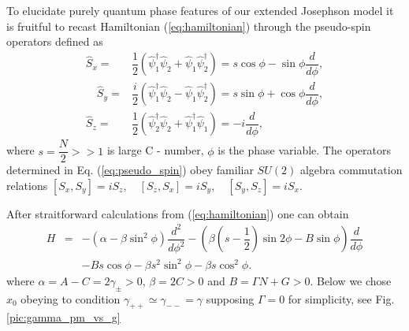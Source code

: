 \documentclass[aps, pre, preprint, groupedaddress, superscriptaddress, showkeys, showpacs] {revtex4-1}
\begin{document}
To elucidate purely quantum phase features of our extended Josephson model it is fruitful to recast Hamiltonian (\ref{eq:hamiltonian}) through the pseudo-spin operators defined as
% 
\begin{subequations}
\begin{align}
\hat{S}_x = & \dfrac{1}{2} (\hat{\psi}_1^\dag \hat{\psi}_2 + \hat{\psi}_1 \hat{\psi}_2^\dag) = s \cos{\phi} - \sin{\phi} \dfrac{d}{d \phi}, \\
\quad \hat{S}_y = & \dfrac{i}{2} (\hat{\psi}_1^\dag \hat{\psi}_2 - \hat{\psi}_1 \hat{\psi}_2^\dag) = s \sin{\phi} + \cos{\phi} \dfrac{d}{d \phi}, \\
\hat{S}_z = & \dfrac{1}{2} (\hat{\psi}_2^\dag \hat{\psi}_2 + \hat{\psi}_1^\dag \hat{\psi}_1) = -i\dfrac{d}{d \phi},
\end{align}
\label{eq:pseudo_spin}
\end{subequations}
%
where $s = \dfrac{N}{2} >> 1$ is large { C - number}, $\phi$ is the phase variable.
The operators determined in Eq. (\ref{eq:pseudo_spin}) obey familiar $SU(2)$ algebra commutation relations $[S_x, S_y] = iS_z, \quad[S_z, S_x] = iS_y, \quad[S_y, S_z] = iS_x$.

After straitforward calculations from (\ref{eq:hamiltonian}) one can obtain
%
\begin{equation}
\begin{array}{lcl}
H & = & -(\alpha - \beta \sin^2 \phi) \dfrac{d^2}{d \phi^2} - (\beta(s-\dfrac{1}{2})\sin{2\phi} - B\sin{\phi}) \dfrac{d}{d \phi} \\
&& - Bs \cos \phi - \beta s^2 \sin^2 \phi - \beta s \cos^2 \phi.
\end{array}
\label{eq:hamiltinian_s}
\end{equation}
%
where $\alpha = A - C = 2\gamma_{\pm} > 0$, $\beta = 2C > 0$ and $B = \Gamma N + G > 0$.
Below we chose $x_0$ obeying to condition $\gamma_{++} \simeq \gamma_{--} = \gamma$ supposing $\Gamma = 0$ for simplicity, see Fig. \ref{pic:gamma_pm_vs_g}
\end{document}
